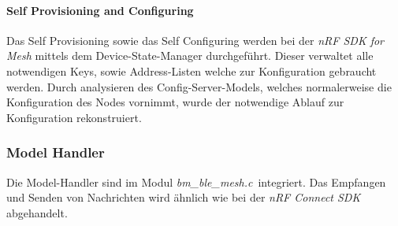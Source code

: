 \paragraph{Self Provisioning and Configuring}

Das Self Provisioning sowie das Self Configuring werden bei der \textit{nRF SDK for Mesh} mittels dem Device-State-Manager durchgeführt. Dieser verwaltet alle notwendigen Keys, sowie Address-Listen welche zur Konfiguration gebraucht werden. Durch analysieren des Config-Server-Models, welches normalerweise die Konfiguration des Nodes vornimmt, wurde der notwendige Ablauf zur Konfiguration rekonstruiert. 

\subsubsection{Model Handler}\label{subsubsec:BluetoothMeshUmsetzungnRFSDKModelHandler}

Die Model-Handler sind im Modul \textit{bm\_ble\_mesh.c}\footnotemark\ integriert. Das Empfangen und Senden von Nachrichten wird ähnlich wie bei der \textit{nRF Connect SDK} abgehandelt. 
